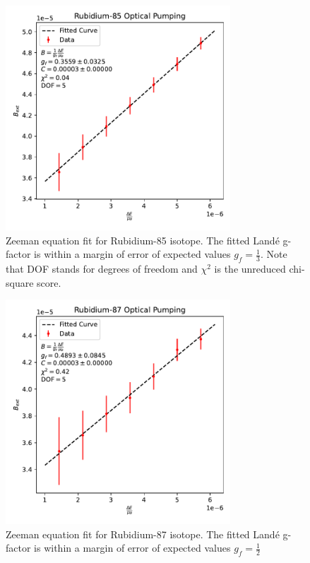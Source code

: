 \documentclass[12pt, letterpaper]{article}
\begin{document}
\begin{figure}[!h]
    \centering
    \includegraphics[width=0.75\textwidth]{experiment4/figures/rb85.pdf}
    \caption{Zeeman equation fit for Rubidium-85 isotope. The fitted Landé g-factor is within a margin of error of expected values $g_f = \frac{1}{3}$. Note that DOF stands for degrees of freedom and $\chi^2$ is the unreduced chi-square score. }
    \label{fig:rb85}
\end{figure}

\begin{figure}[!h]
    \centering
    \includegraphics[width=0.75\textwidth]{experiment4/figures/rb87.pdf}
    \caption{Zeeman equation fit for Rubidium-87 isotope. The fitted Landé g-factor is within a margin of error of expected values $g_f = \frac{1}{2}$}
    \label{fig:rb87}
\end{figure}
\end{document}
